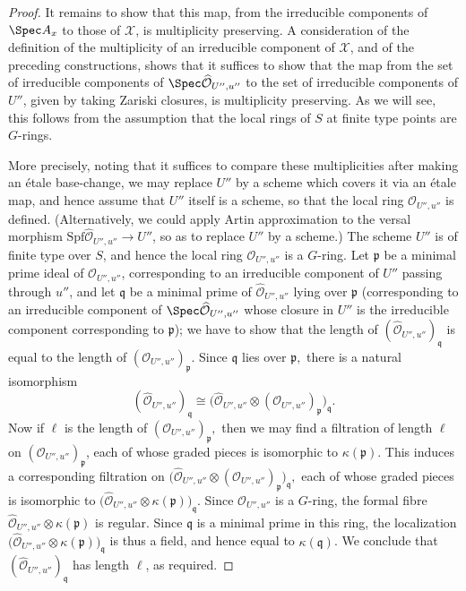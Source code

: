 \begin{proof}
\medskip\noindent
It remains to show that this map, from the irreducible components
of $\Spec A_x$ to those of $\mathcal{X}$, is multiplicity preserving.
A consideration of the definition of the multiplicity of an irreducible
component of $\mathcal{X}$, and of the preceding constructions,
shows that it suffices to show that the map from the set of
irreducible components of $\Spec \widehat{\mathcal{O}}_{U'',u''}$ to
the set of irreducible components of $U''$, given by taking Zariski closures,
is multiplicity preserving.  As we will see, this follows from the assumption
that the local rings of $S$ at finite type points are $G$-rings.

\medskip\noindent
More precisely, noting that it suffices to compare these multiplicities
after making an \'etale base-change, we may replace $U''$
by a scheme which covers it via an \'etale map, and hence assume
that $U''$ itself is a scheme, so that the local ring
$\mathcal{O}_{U'',u''}$ is defined. (Alternatively, we could apply
Artin approximation to the versal morphism
$\text{Spf} \widehat{\mathcal{O}}_{U'',u''} \to U''$, so as to replace $U''$
by a scheme.)
The scheme $U''$ is of finite type over $S$,
and hence the local ring $\mathcal{O}_{U'',u''}$ is a $G$-ring.
Let $\mathfrak p$ be a minimal prime ideal of $\mathcal{O}_{U'',u''}$,
corresponding to an irreducible component of $U''$ passing
through $u''$, and let $\mathfrak q$ be a minimal prime
of $\widehat{\mathcal{O}}_{U'',u''}$ lying over $\mathfrak p$
(corresponding to an irreducible component of
$\Spec \widehat{\mathcal{O}}_{U'',u''}$
whose closure in $U''$ is the irreducible component corresponding to
$\mathfrak p$);
we have to show that the length
of $(\widehat{\mathcal{O}}_{U'',u''})_{\mathfrak q}$ is equal to the length of
$(\mathcal{O}_{U'',u''})_{\mathfrak p}$.
Since $\mathfrak q$ lies over $\mathfrak p,$
there is a natural isomorphism
$$
(\widehat{\mathcal{O}}_{U'',u''})_{\mathfrak q}
\cong
\bigl(\widehat{\mathcal{O}}_{U'',u''} \otimes
(\mathcal{O}_{U'',u''})_{\mathfrak p}\bigr)_{\mathfrak q}.
$$
Now if $\ell$ is the length of
$(\mathcal{O}_{U'',u''})_{\mathfrak p},$
then we may find a filtration of length $\ell$ on
$(\mathcal{O}_{U'',u''})_{\mathfrak p}$, each of whose graded
pieces is isomorphic to $\kappa(\mathfrak p)$.
This induces a corresponding filtration on
$\bigl(\widehat{\mathcal{O}}_{U'',u''} \otimes
(\mathcal{O}_{U'',u''})_{\mathfrak p}\bigr)_{\mathfrak q},$
each of whose graded pieces is isomorphic to
$\bigl(\widehat{\mathcal{O}}_{U'',u''} \otimes
\kappa(\mathfrak p)\bigr)_{\mathfrak q}.$
Since $\mathcal{O}_{U'',u''}$ is a $G$-ring,
the formal fibre
$\widehat{\mathcal{O}}_{U'',u''} \otimes
\kappa(\mathfrak p)$ is regular.
Since $\mathfrak q$ is a minimal prime in this ring,
the localization
$\bigl(\widehat{\mathcal{O}}_{U'',u''} \otimes
\kappa(\mathfrak p)\bigr)_{\mathfrak q}$
is thus a field, and hence equal to $\kappa(\mathfrak q)$.
We conclude that $(\widehat{\mathcal{O}}_{U'',u''})_{\mathfrak q}$
has length $\ell$, as required.
\end{proof}

